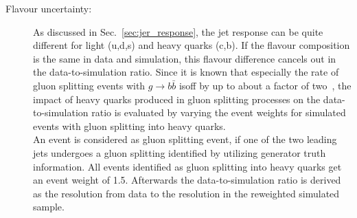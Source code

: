 \begin{description}
\item[Flavour uncertainty:] As discussed in Sec.~\ref{sec:jer_response}, the jet response can be quite different for light (u,d,s) and heavy quarks (c,b). If the flavour composition is the same in data and simulation, this flavour difference cancels out in the data-to-simulation ratio. Since it is known that especially the rate of gluon splitting events with $g \rightarrow b\bar{b}$ isoff by up to about a factor of two~\cite{Khachatryan:2011wq}, the impact of heavy quarks produced in gluon splitting processes on the data-to-simulation ratio is evaluated by varying the event weights for simulated events with gluon splitting into heavy quarks.\\
An event is considered as gluon splitting event, if one of the two leading jets undergoes a gluon splitting identified by utilizing generator truth information. All events identified as gluon splitting into heavy quarks get an event weight of 1.5. Afterwards the data-to-simulation ratio is derived as the resolution from data to the resolution in the reweighted simulated sample. 


\end{description}
